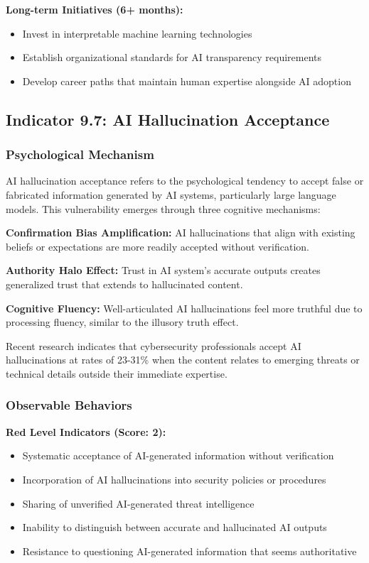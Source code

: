 \documentclass[11pt,a4paper]{article}
\begin{document}
\textbf{Long-term Initiatives (6+ months):}
\begin{itemize}
\item Invest in interpretable machine learning technologies
\item Establish organizational standards for AI transparency requirements
\item Develop career paths that maintain human expertise alongside AI adoption
\end{itemize}

\subsection{Indicator 9.7: AI Hallucination Acceptance}

\subsubsection{Psychological Mechanism}

AI hallucination acceptance refers to the psychological tendency to accept false or fabricated information generated by AI systems, particularly large language models. This vulnerability emerges through three cognitive mechanisms:

\textbf{Confirmation Bias Amplification:} AI hallucinations that align with existing beliefs or expectations are more readily accepted without verification\cite{confirmation2024}.

\textbf{Authority Halo Effect:} Trust in AI system's accurate outputs creates generalized trust that extends to hallucinated content\cite{halo2023}.

\textbf{Cognitive Fluency:} Well-articulated AI hallucinations feel more truthful due to processing fluency, similar to the illusory truth effect\cite{fluency2024}.

Recent research indicates that cybersecurity professionals accept AI hallucinations at rates of 23-31\% when the content relates to emerging threats or technical details outside their immediate expertise\cite{hallucination2024}.

\subsubsection{Observable Behaviors}

\textbf{Red Level Indicators (Score: 2):}
\begin{itemize}
\item Systematic acceptance of AI-generated information without verification
\item Incorporation of AI hallucinations into security policies or procedures
\item Sharing of unverified AI-generated threat intelligence
\item Inability to distinguish between accurate and hallucinated AI outputs
\item Resistance to questioning AI-generated information that seems authoritative
\end{itemize}
\end{document}
